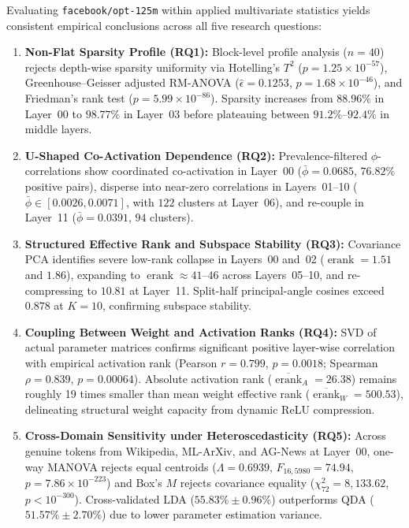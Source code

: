 \documentclass[12pt, a4paper, oneside]{report}
\theoremstyle{definition}
\newcommand{\erank}{\operatorname{erank}}
\begin{document}
Evaluating \texttt{facebook/opt-125m} within applied multivariate statistics yields consistent empirical conclusions across all five research questions:
\begin{enumerate}
    \item \textbf{Non-Flat Sparsity Profile (RQ1):} Block-level profile analysis ($n = 40$) rejects depth-wise sparsity uniformity via Hotelling's $T^2$ ($p = 1.25 \times 10^{-57}$), Greenhouse--Geisser adjusted RM-ANOVA ($\hat{\epsilon} = 0.1253$, $p = 1.68 \times 10^{-46}$), and Friedman's rank test ($p = 5.99 \times 10^{-86}$). Sparsity increases from $88.96\%$ in Layer~00 to $98.77\%$ in Layer~03 before plateauing between $91.2\%\text{--}92.4\%$ in middle layers.
    \item \textbf{U-Shaped Co-Activation Dependence (RQ2):} Prevalence-filtered $\phi$-correlations show coordinated co-activation in Layer~00 ($\bar{\phi} = 0.0685$, $76.82\%$ positive pairs), disperse into near-zero correlations in Layers~01--10 ($\bar{\phi} \in [0.0026, 0.0071]$, with $122$ clusters at Layer~06), and re-couple in Layer~11 ($\bar{\phi} = 0.0391$, $94$ clusters).
    \item \textbf{Structured Effective Rank and Subspace Stability (RQ3):} Covariance PCA identifies severe low-rank collapse in Layers~00 and~02 ($\erank = 1.51$ and $1.86$), expanding to $\erank \approx 41\text{--}46$ across Layers~05--10, and re-compressing to $10.81$ at Layer~11. Split-half principal-angle cosines exceed $0.878$ at $K = 10$, confirming subspace stability.
    \item \textbf{Coupling Between Weight and Activation Ranks (RQ4):} SVD of actual parameter matrices confirms significant positive layer-wise correlation with empirical activation rank (Pearson $r = 0.799$, $p = 0.0018$; Spearman $\rho = 0.839$, $p = 0.00064$). Absolute activation rank ($\overline{\erank}_A = 26.38$) remains roughly 19 times smaller than mean weight effective rank ($\overline{\erank}_W = 500.53$), delineating structural weight capacity from dynamic ReLU compression.
    \item \textbf{Cross-Domain Sensitivity under Heteroscedasticity (RQ5):} Across genuine tokens from Wikipedia, ML-ArXiv, and AG-News at Layer~00, one-way MANOVA rejects equal centroids ($\Lambda = 0.6939$, $F_{16, 5980} = 74.94$, $p = 7.86 \times 10^{-223}$) and Box's $M$ rejects covariance equality ($\chi^2_{72} = 8{,}133.62$, $p < 10^{-300}$). Cross-validated LDA ($55.83\% \pm 0.96\%$) outperforms QDA ($51.57\% \pm 2.70\%$) due to lower parameter estimation variance.
\end{enumerate}
\end{document}
